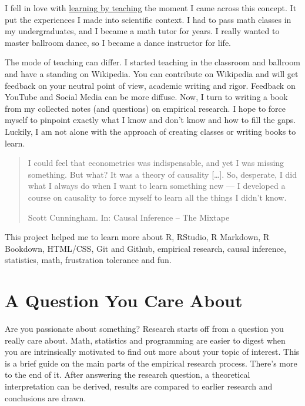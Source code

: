 \documentclass[
]{book}
\begin{document}
I fell in love with \href{https://en.wikipedia.org/wiki/Learning_by_teaching}{learning by teaching} the moment I came across this concept. It put the experiences I made into scientific context. I had to pass math classes in my undergraduates, and I became a math tutor for years. I really wanted to master ballroom dance, so I became a dance instructor for life.

The mode of teaching can differ. I started teaching in the classroom and ballroom and have a standing on Wikipedia. You can contribute on Wikipedia and will get feedback on your neutral point of view, academic writing and rigor. Feedback on YouTube and Social Media can be more diffuse. Now, I turn to writing a book from my collected notes (and questions) on empirical research. I hope to force myself to pinpoint exactly what I know and don't know and how to fill the gaps. Luckily, I am not alone with the approach of creating classes or writing books to learn.

\begin{quote}
I could feel that econometrics was indispensable, and yet I was missing something. But what? It was a theory of causality {[}\ldots{]}. So, desperate, I did what I always do when I want to learn something new --- I developed a course on causality to force myself to learn all the things I didn't know.

\hfill Scott Cunningham. In: Causal Inference -- The Mixtape
\end{quote}

This project helped me to learn more about R, RStudio, R Markdown, R Bookdown, HTML/CSS, Git and Github, empirical research, causal inference, statistics, math, frustration tolerance and fun.

\hypertarget{a-question-you-care-about}{%
\chapter*{A Question You Care About}\label{a-question-you-care-about}}

Are you passionate about something? Research starts off from a question you really care about. Math, statistics and programming are easier to digest when you are intrinsically motivated to find out more about your topic of interest. This is a brief guide on the main parts of the empirical research process. There's more to the end of it. After answering the research question, a theoretical interpretation can be derived, results are compared to earlier research and conclusions are drawn.
\end{document}
